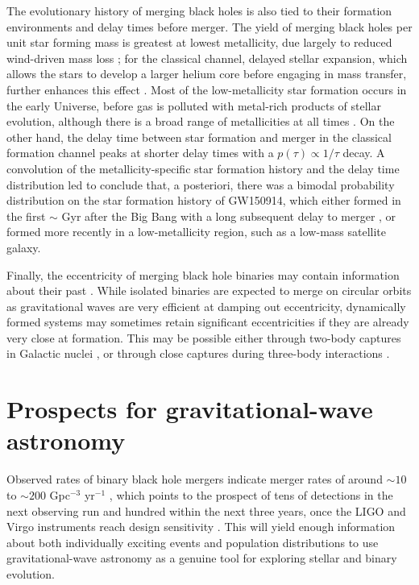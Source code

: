 \documentclass[iop,onecolumn]{revtex4}
\begin{document}
The evolutionary history of merging black holes is also tied to their formation environments and delay times before merger.  
The yield of merging black holes per unit star forming mass is greatest at lowest metallicity, due largely to reduced wind-driven mass loss \citep[e.g.,][]{Belczynski:2010}; for the classical channel, delayed stellar expansion, which allows the stars to develop a larger helium core before engaging in mass transfer, further enhances this effect \citep[e.g.,][]{Stevenson:2017}.  Most of the low-metallicity star formation occurs in the early Universe, before gas is polluted with metal-rich products of stellar evolution, although there is a broad range of metallicities at all times \citep[e.g.,][]{LangerNorman:2006,TaylorKobayashi:2015}.  On the other hand, the delay time between star formation and merger in the classical formation channel peaks at shorter delay times with a $p(\tau) \propto 1/\tau$ decay.  A convolution of the metallicity-specific star formation history and the delay time distribution led \citet{Belczynski:2016} to conclude that, a posteriori, there was a bimodal probability distribution on the star formation history of GW150914, which either formed in the first $\sim$ Gyr after the Big Bang with a long subsequent delay to merger \citep{Dominik:2014}, or formed more recently in a low-metallicity region, such as a low-mass satellite galaxy.  

Finally, the eccentricity of merging black hole binaries may contain information about their past \citep{MandelOShaughnessy:2010}.  While isolated binaries are expected to merge on circular orbits as gravitational waves are very efficient at damping out eccentricity, dynamically formed systems may sometimes retain significant eccentricities if they are already very close at formation.  This may be possible either through two-body captures in Galactic nuclei \citep{OLeary:2008} \citet[but see][]{Tsang:2013}, or through close captures during three-body interactions \citep{Samsing:2014}.

\section{Prospects for gravitational-wave astronomy}\label{prospect}

Observed rates of binary black hole mergers indicate merger rates of around $\sim 10$ to $\sim 200$ Gpc$^{-3}$ yr$^{-1}$ \citep{GW150914:rates,GW170104}, which points to the prospect of tens of detections in the next observing run and hundred within the next three years, once the LIGO and Virgo instruments reach design sensitivity \citep{scenarios}.  This will yield enough information about both individually exciting events and population distributions to use gravitational-wave astronomy as a genuine tool for exploring stellar and binary evolution.  
\end{document}
